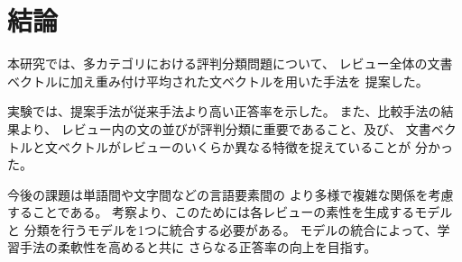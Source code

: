 \section{結論}

本研究では、多カテゴリにおける評判分類問題について、
レビュー全体の文書ベクトルに加え重み付け平均された文ベクトルを用いた手法を
提案した。

実験では、提案手法が従来手法\cite{fujitani15}より高い正答率を示した。
また、比較手法の結果より、
レビュー内の文の並びが評判分類に重要であること、及び、
文書ベクトルと文ベクトルがレビューのいくらか異なる特徴を捉えていることが
分かった。

今後の課題は単語間や文字間などの言語要素間の
より多様で複雑な関係を考慮することである。
考察より、このためには各レビューの素性を生成するモデルと
分類を行うモデルを1つに統合する必要がある。
モデルの統合によって、学習手法の柔軟性を高めると共に
さらなる正答率の向上を目指す。

